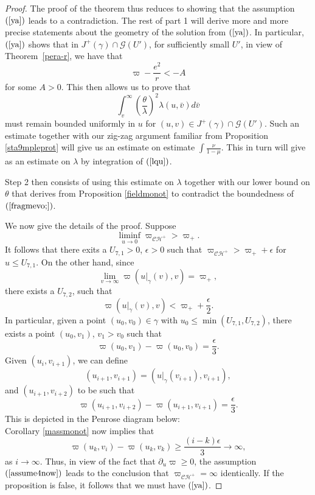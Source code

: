 \documentclass{article}
\newcommand{\tl}{\frac{\theta}{\lambda}}
\begin{document}
{\begin{proof}
The proof of the theorem thus reduces to showing 
that the assumption $(\ref{ya})$
leads to a contradiction. The rest of part 1 will 
derive more and more precise statements about the geometry of
the solution from
$(\ref{ya})$.
In particular, $(\ref{ya})$ shows that in $J^+(\gamma)
\cap\mathcal{G}(U')$, for sufficiently
small $U'$, in view of Theorem~\ref{pera-r}, we have that 
\begin{equation}
\label{masftavei}
\varpi-\frac{e^2}r<-A
\end{equation}
for some $A>0$.
This then allows us to prove that
\begin{equation}
\label{fragmevo;}
\int_v^\infty{\left(\tl\right)^2\lambda(u,\bar{v}) d\bar{v}}
\end{equation}
must remain bounded uniformly in $u$ for 
$(u,v)\in J^+(\gamma)\cap\mathcal{G}(U')$.
Such an estimate together with our zig-zag argument familiar from
Proposition \ref{sta9mpleprot} will give
us an estimate on estimate $\int\frac{\nu}{1-\mu}$. This in turn will
give as an estimate on $\lambda$ by integration of $(\ref{lqu})$.
 
Step 2 then consists of using this estimate on $\lambda$ together 
with our lower bound on $\theta$ that derives from Proposition
\ref{fieldmonot} to contradict the boundedness of $(\ref{fragmevo;})$.

We now give the details of the proof.
Suppose
\begin{equation}
\label{assume4now}
\liminf_{u\to0}\varpi_{\mathcal{CH}^+}>\varpi_+.
\end{equation}
It follows that there exits a $U_{7,1}>0$, $\epsilon>0$ such that
$\varpi_{\mathcal{CH}^+}>\varpi_++\epsilon$ for $u\le U_{7,1}$.
On the other hand, since 
\[
\lim_{v\to\infty}\varpi(u|_\gamma(v),v)=\varpi_+,
\]
there exists a $U_{7,2}$, such that
\[
\varpi(u|_\gamma(v),v)<\varpi_++\frac\epsilon2.
\]
In particular,
given a point $(u_0,v_0)\in\gamma$ with $u_0\le\min(U_{7,1},U_{7,2})$,
there exists a point $(u_0,v_1)$, $v_1>v_0$ such that
\[
\varpi(u_0,v_1)-\varpi(u_0,v_0)=\frac\epsilon3.
\]
Given $(u_i,v_{i+1})$, we can define 
\[
(u_{i+1},v_{i+1})=(u|_\gamma(v_{i+1}),v_{i+1}),
\]
and $(u_{i+1}, v_{i+2})$ to be such that
\begin{equation}
\label{stoepomevo}
\varpi(u_{i+1},v_{i+2})-\varpi(u_{i+1},v_{i+1})=\frac\epsilon3.
\end{equation}
This is depicted in the Penrose diagram below:
\[

\]
Corollary \ref{massmonot} now
implies that 
\[
\varpi(u_k,v_i)-\varpi(u_k,v_k)\ge\frac{(i-k)\epsilon}3\to\infty,
\]
as $i\to\infty$. Thus, in view of the fact that $\partial_u\varpi\ge0$,
the assumption $(\ref{assume4now})$ leads to the conclusion
that $\varpi_{\mathcal{CH}^+}=\infty$ identically. If the proposition is 
false, it follows
that we must have $(\ref{ya})$.


\end{proof}}
\end{document}
